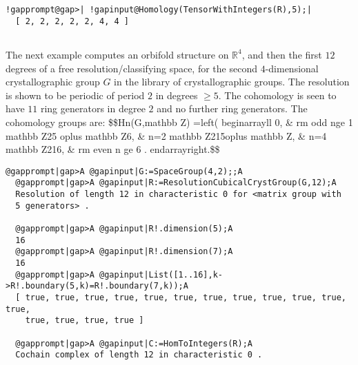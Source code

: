 \documentclass[a4paper,11pt]{report}
\begin{document}
{{\begin{Verbatim}[commandchars=!@|,fontsize=\small,frame=single,label=Example]
  !gapprompt@gap>| !gapinput@Homology(TensorWithIntegers(R),5);|
  [ 2, 2, 2, 2, 2, 4, 4 ]
  
\end{Verbatim}
 The next example computes an orbifold structure on $\mathbb R^4$, and then the first $12$ degrees of a free resolution/classifying space, for the second $4$-dimensional crystallographic group $G$ in the library of crystallographic groups. The resolution is shown to be
periodic of period $2$ in degrees $\ge 5$. The cohomology is seen to have $11$ ring generators in degree $2$ and no further ring generators. The cohomology groups are:
\$\$H\texttt{}n(G,\texttt{}mathbb Z)
=\texttt{}left(
\texttt{}begin\texttt{}array\texttt{}\texttt{}ll\texttt{}
0, \& \texttt{}\texttt{}rm
odd\texttt{}\texttt{} n\texttt{}ge
1\texttt{}\texttt{} \texttt{}mathbb
Z{\textunderscore}2\texttt{}5 \texttt{}oplus
\texttt{}mathbb Z\texttt{}6, \&
n=2\texttt{}\texttt{} \texttt{}mathbb
Z{\textunderscore}2\texttt{}\texttt{}15\texttt{}\texttt{}oplus
\texttt{}mathbb Z, \& n=4\texttt{}\texttt{}
\texttt{}mathbb
Z{\textunderscore}2\texttt{}\texttt{}16\texttt{},
\& \texttt{}\texttt{}rm
even\texttt{}\texttt{} n \texttt{}ge 6
.\texttt{}\texttt{}
\texttt{}end\texttt{}array\texttt{}\texttt{}right.\$\$ 
\begin{Verbatim}[commandchars=@|A,fontsize=\small,frame=single,label=Example]
  @gapprompt|gap>A @gapinput|G:=SpaceGroup(4,2);;A
  @gapprompt|gap>A @gapinput|R:=ResolutionCubicalCrystGroup(G,12);A
  Resolution of length 12 in characteristic 0 for <matrix group with 
  5 generators> . 
  
  @gapprompt|gap>A @gapinput|R!.dimension(5);A
  16
  @gapprompt|gap>A @gapinput|R!.dimension(7);A
  16
  @gapprompt|gap>A @gapinput|List([1..16],k->R!.boundary(5,k)=R!.boundary(7,k));A
  [ true, true, true, true, true, true, true, true, true, true, true, true, 
    true, true, true, true ]
  
  @gapprompt|gap>A @gapinput|C:=HomToIntegers(R);A
  Cochain complex of length 12 in characteristic 0 . 
  

\end{Verbatim}}}
\end{document}
